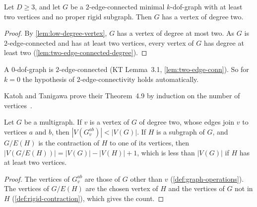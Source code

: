 \begin{lemma}
  \label{lem:reducible-vertex}
  \leanok
  Let $D \ge 3$, and let $G$ be a $2$-edge-connected minimal
  $k$-dof-graph with at least two vertices and no proper rigid subgraph.
  Then $G$ has a vertex of degree two.
\end{lemma}
\begin{proof}
  \leanok
  By \cref{lem:low-degree-vertex}, $G$ has a vertex of degree at most
  two. As $G$ is $2$-edge-connected and has at least two vertices, every
  vertex of $G$ has degree at least two
  (\cref{lem:two-edge-connected-degree}).
\end{proof}

A $0$-dof-graph is $2$-edge-connected (KT Lemma~3.1,
\cref{lem:two-edge-conn}). So for $k = 0$ the hypothesis of
$2$-edge-connectivity holds automatically.

Katoh and Tanigawa prove their Theorem~4.9 by induction on the number of
vertices~\cite[pp.~666--667]{katohTanigawa2011}.

\begin{lemma}
  \label{lem:reduction-measure}
  \leanok
  Let $G$ be a multigraph. If $v$ is a vertex of $G$ of degree two, whose
  edges join $v$ to vertices $a$ and $b$, then
  $|V(G_v^{ab})| < |V(G)|$. If $H$ is a subgraph of $G$, and $G/E(H)$ is
  the contraction of $H$ to one of its vertices, then
  $|V(G/E(H))| = |V(G)| - |V(H)| + 1$, which is less than $|V(G)|$ if
  $H$ has at least two vertices.
\end{lemma}
\begin{proof}
  \leanok
  The vertices of $G_v^{ab}$ are those of $G$ other than $v$
  (\cref{def:graph-operations}). The vertices of $G/E(H)$ are the chosen
  vertex of $H$ and the vertices of $G$ not in $H$
  (\cref{def:rigid-contraction}), which gives the count.
\end{proof}

